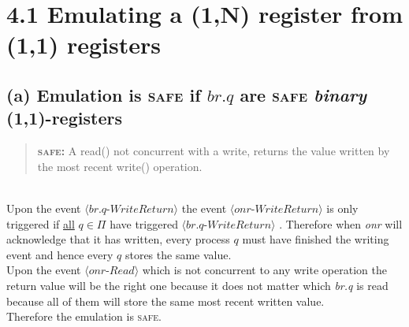 \documentclass{article}
\begin{document}
	\pagestyle{fancy}
	
	\section*{4.1 Emulating a (1,N) register from (1,1) registers}
	\begin{adjustwidth}{2em}{2em}
		\subsection*{(a) Emulation is \textsc{safe} if $br.q$ are \textsc{safe} \textit{binary} (1,1)-registers}
		\begin{adjustwidth}{1em}{2em}
			\begin{quote}
				\textbf{\textsc{safe}:} A read() not concurrent with a write, returns the value written by the most recent write() operation.
			\end{quote}
			\hfill \\
			Upon the event $\langle \textit{br.q-WriteReturn} \rangle$ the event  $\langle \textit{onr-WriteReturn} \rangle$ is only triggered if \underline{all} $q \in \Pi$ have triggered $\langle \textit{br.q-WriteReturn} \rangle$ . Therefore when \textit{onr} will acknowledge that it has written, every process $q$ must have finished the writing event and hence every $q$ stores the same value. \\
			Upon the event $\langle \textit{onr-Read} \rangle$ which is not concurrent to any write operation the return value will be the right one because it does not matter which \textit{br.q} is read because all of them will store the same most recent written value. \\
			Therefore the emulation is \textsc{safe}.
		\end{adjustwidth}

\end{adjustwidth}
\end{document}
